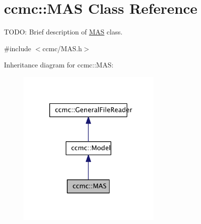 \hypertarget{classccmc_1_1_m_a_s}{\section{ccmc\-:\-:M\-A\-S Class Reference}
\label{classccmc_1_1_m_a_s}
}


T\-O\-D\-O\-: Brief description of \hyperlink{classccmc_1_1_m_a_s}{M\-A\-S} class.  




{\ttfamily \#include $<$ccmc/\-M\-A\-S.\-h$>$}



Inheritance diagram for ccmc\-:\-:M\-A\-S\-:\nopagebreak
\begin{figure}[H]
\begin{center}
\leavevmode
\includegraphics[width=198pt]{classccmc_1_1_m_a_s__inherit__graph}
\end{center}
\end{figure}



